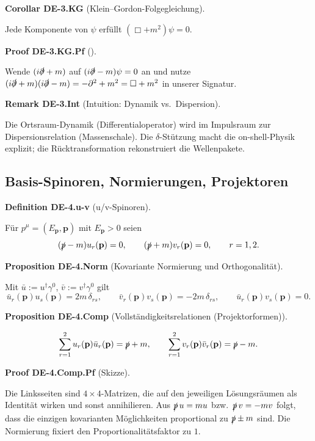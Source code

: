 \documentclass[10pt, letterpaper]{article}
\newcommand{\CustomHeading}[3]{%
  \par\medskip\noindent%
  \textbf{#1 #2} \textnormal{(#3)}.\enskip%
}
\newenvironment{DEF}[2]{\begin{unitbox}\CustomHeading{Definition}{#1}{#2}}{\end{unitbox}}
\newenvironment{PROP}[2]{\begin{unitbox}\CustomHeading{Proposition}{#1}{#2}}{\end{unitbox}}
\newenvironment{KORO}[2]{\begin{unitbox}\CustomHeading{Corollar}{#1}{#2}}{\end{unitbox}}
\newenvironment{REM}[2]{\begin{unitbox}\CustomHeading{Remark}{#1}{#2}}{\end{unitbox}}
\newenvironment{PROOF}[2]{\begin{unitbox}\CustomHeading{Proof}{#1}{#2}}{\end{unitbox}}
\begin{document}
\begin{KORO}{DE-3.KG}{Klein--Gordon-Folgegleichung}
Jede Komponente von $\psi$ erfüllt $(\Box+m^2)\psi=0$.
\end{KORO}

\begin{PROOF}{DE-3.KG.Pf}{}
Wende $(i\slashed\partial+m)$ auf $(i\slashed\partial-m)\psi=0$ an und nutze $(i\slashed\partial+m)(i\slashed\partial-m)= -\partial^2 + m^2=\Box+m^2$ in unserer Signatur.
\end{PROOF}

\begin{REM}{DE-3.Int}{Intuition: Dynamik vs.\ Dispersion}
Die Ortsraum-Dynamik (Differentialoperator) wird im Impulsraum zur Dispersionsrelation (Massenschale). Die $\delta$-Stützung macht die on-shell-Physik explizit; die Rücktransformation rekonstruiert die Wellenpakete.
\end{REM}

\subsection{Basis-Spinoren, Normierungen, Projektoren}

\begin{DEF}{DE-4.u-v}{u/v-Spinoren}
Für $p^\mu=(E_{\mathbf p},\mathbf p)$ mit $E_{\mathbf p}>0$ seien
\[
(\slashed p - m)u_r(\mathbf p)=0,\qquad (\slashed p + m)v_r(\mathbf p)=0,\qquad r=1,2.
\]
\end{DEF}

\begin{PROP}{DE-4.Norm}{Kovariante Normierung und Orthogonalität}
Mit $\bar u:=u^\dagger\gamma^0$, $\bar v:=v^\dagger\gamma^0$ gilt
\[
\bar u_r(\mathbf p)u_s(\mathbf p)=2m\,\delta_{rs},\qquad
\bar v_r(\mathbf p)v_s(\mathbf p)=-2m\,\delta_{rs},\qquad
\bar u_r(\mathbf p)v_s(\mathbf p)=0.
\]
\end{PROP}

\begin{PROP}{DE-4.Comp}{Vollständigkeitsrelationen (Projektorformen)}
\[
\sum_{r=1}^2 u_r(\mathbf p)\bar u_r(\mathbf p)=\slashed p + m,\qquad
\sum_{r=1}^2 v_r(\mathbf p)\bar v_r(\mathbf p)=\slashed p - m.
\]
\end{PROP}

\begin{PROOF}{DE-4.Comp.Pf}{Skizze}
Die Linksseiten sind $4\times4$-Matrizen, die auf den jeweiligen Lösungsräumen als Identität wirken und sonst annihilieren. Aus $\slashed p\,u=mu$ bzw.\ $\slashed p\,v=-mv$ folgt, dass die einzigen kovarianten Möglichkeiten proportional zu $\slashed p\pm m$ sind. Die Normierung fixiert den Proportionalitätsfaktor zu $1$.
\end{PROOF}
\end{document}
